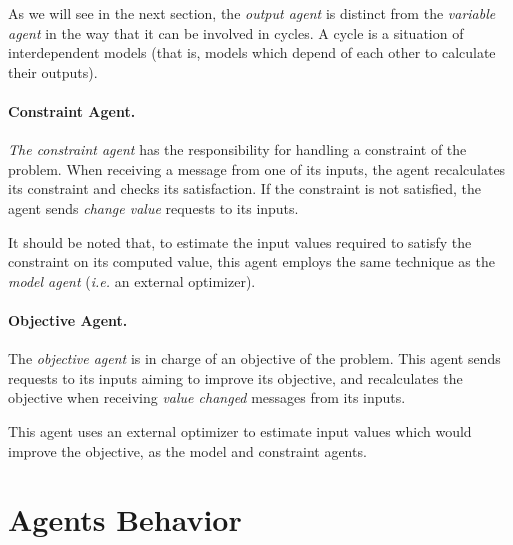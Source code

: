 As we will see in the next section, the \emph{output agent} is distinct from the \emph{variable agent} in the way that it can be involved in cycles. A cycle is a situation of interdependent models (that is, models which depend of each other to calculate their outputs).


\subsubsection*{Constraint Agent.}
 \emph{The constraint agent} has the responsibility for handling a constraint of the problem. When receiving a message from one of its inputs, the agent recalculates its constraint and checks its satisfaction. If the constraint is not satisfied, the agent sends \emph{change value} requests to its inputs.


It should be noted that, to estimate the input values required to satisfy the constraint on its computed value, this agent employs the same technique as the \emph{model agent} (\textit{i.e.} an external optimizer).

\subsubsection*{Objective Agent.}
The  \emph{objective agent} is in charge of an objective of the problem. This agent sends requests to its inputs aiming to improve its objective, and recalculates the objective when receiving  \emph{value changed} messages from its inputs.

This agent uses an external optimizer to estimate input values which would improve the objective, as the model and constraint agents.




\chapter{Agents Behavior}

